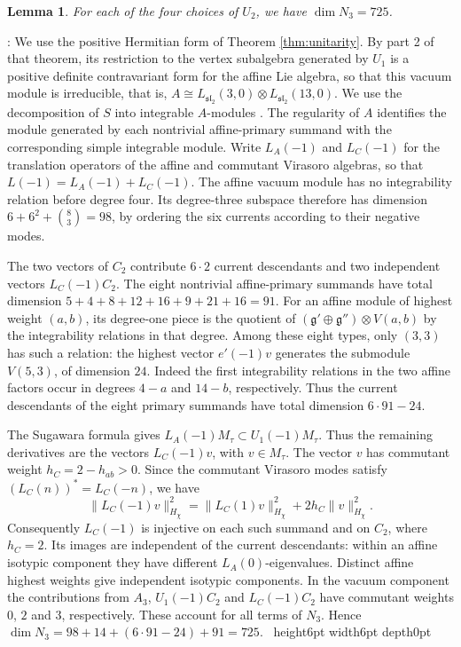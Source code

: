 \documentclass[leqno]{article}
\newcommand{\qed}{\hfill \vrule height6pt  width6pt depth0pt}
\newcommand{\ot}{\otimes}
\newtheorem{lemma}[thm]{Lemma}
\newenvironment{proof}[1][]{\noindent {\it Proof #1} : }{\hbox{~}\qed
\smallskip
}
\numberwithin{equation}{section}
\begin{document}
\begin{lemma}
\label{lem:normal-weight-three-dimension}
For each of the four choices of $U_2$, we have $\dim N_3 = 725$.
\end{lemma}

\begin{proof}
We use the positive Hermitian form of Theorem \ref{thm:unitarity}. By part 2 of that theorem, its restriction to the vertex subalgebra generated by $U_1$ is a positive definite contravariant form for the affine Lie algebra, so that this vacuum module is irreducible, that is, $A \cong L_{\mathfrak{sl}_2}(3,0) \ot L_{\mathfrak{sl}_2}(13,0)$. We use the decomposition of $S$ into integrable $A$-modules \cite[Theorem 3.7 p.~7]{DLM97}. The regularity of $A$ identifies the module generated by each nontrivial affine-primary summand with the corresponding simple integrable module. Write $L_A(-1)$ and $L_C(-1)$ for the translation operators of the affine and commutant Virasoro algebras, so that $L(-1) = L_A(-1)+L_C(-1)$. The affine vacuum module has no integrability relation before degree four. Its degree-three subspace therefore has dimension $6+6^2+\binom{8}{3} = 98$, by ordering the six currents according to their negative modes.

The two vectors of $C_2$ contribute $6\cdot 2$ current descendants and two independent vectors $L_C(-1)C_2$. The eight nontrivial affine-primary summands have total dimension $5+4+8+12+16+9+21+16 = 91$. For an affine module of highest weight $(a,b)$, its degree-one piece is the quotient of $(\mathfrak g' \oplus \mathfrak g'') \ot V(a,b)$ by the integrability relations in that degree. Among these eight types, only $(3,3)$ has such a relation: the highest vector $e'(-1)v$ generates the submodule $V(5,3)$, of dimension $24$. Indeed the first integrability relations in the two affine factors occur in degrees $4-a$ and $14-b$, respectively. Thus the current descendants of the eight primary summands have total dimension $6\cdot 91-24$.

The Sugawara formula gives $L_A(-1)M_\tau \subset U_1(-1)M_\tau$. Thus the remaining derivatives are the vectors $L_C(-1)v$, with $v \in M_\tau$. The vector $v$ has commutant weight $h_C = 2-h_{ab} > 0$. Since the commutant Virasoro modes satisfy $(L_C(n))^* = L_C(-n)$, we have
\[
\|L_C(-1)v\|_{H_\chi}^2 = \|L_C(1)v\|_{H_\chi}^2 + 2h_C\|v\|_{H_\chi}^2.
\]
Consequently $L_C(-1)$ is injective on each such summand and on $C_2$, where $h_C = 2$. Its images are independent of the current descendants: within an affine isotypic component they have different $L_A(0)$-eigenvalues. Distinct affine highest weights give independent isotypic components. In the vacuum component the contributions from $A_3$, $U_1(-1)C_2$ and $L_C(-1)C_2$ have commutant weights $0$, $2$ and $3$, respectively. These account for all terms of $N_3$. Hence $\dim N_3 = 98+14+(6\cdot 91-24)+91 = 725$.
\end{proof}
\end{document}
